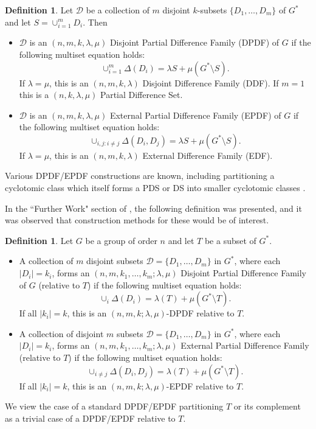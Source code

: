 \documentclass[12pt, a4paper]{article}
\theoremstyle{definition}
\newtheorem{definition}[theorem]{Definition}
\begin{document}
\begin{definition}\label{DPDF}
Let $\mathcal D$ be a collection of $m$ disjoint $k$-subsets $\{ D_1, \ldots, D_m \}$ of $G^*$ and let $S=\cup_{i=1}^m D_i$.  Then
\begin{itemize}
\item[(i)]  $\mathcal D$ is an $(n,m, k, \lambda, \mu)$ Disjoint Partial Difference Family (DPDF) of $G$ if the following multiset equation holds: 
$$ \cup_{i=1}^m \Delta(D_i)= \lambda S + \mu (G^* \setminus S).$$
If $\lambda=\mu$, this is an $(n,m,k,\lambda)$ Disjoint Difference Family (DDF). If $m=1$ this is a $(n,k,\lambda,\mu)$ Partial Difference Set.
\item[(ii)] $\mathcal D$ is an $(n,m, k, \lambda, \mu)$ External Partial Difference Family (EPDF) of $G$ if the following multiset equation holds: 
$$ \cup_{i,j: i \neq j} \Delta(D_i, D_j)= \lambda S + \mu (G^* \setminus S).$$
If $\lambda=\mu$, this is an $(n,m,k,\lambda)$ External Difference Family (EDF).
\end{itemize}
\end{definition}
Various DPDF/EPDF constructions are known, including partitioning a cyclotomic class which itself forms a PDS or DS into smaller cyclotomic classes \cite{HucJoh}.

In the ``Further Work" section of \cite{HucJoh}, the following definition was presented, and it was observed that construction methods for these would be of interest.

\begin{definition}
Let $G$ be a group of order $n$ and let $T$ be a subset of $G^*$. 
\begin{itemize}
\item[(i)] A collection of $m$ disjoint subsets $\mathcal{D} = \{ D_1, \ldots, D_m \}$ in $G^*$, where each $|D_i|=k_i$, forms an $(n,m, k_1, \ldots, k_m; \lambda, \mu)$ Disjoint Partial Difference Family of $G$ (relative to $T$) if the following multiset equation holds: 
$$ \cup_i \Delta(D_i)= \lambda(T) + \mu (G^* \setminus T). $$
If all $|k_i|=k$, this is an $(n,m,k; \lambda, \mu)$-DPDF relative to $T$.
\item[(ii)] A collection of disjoint $m$ subsets $\mathcal{D} = \{ D_1, \ldots, D_m \}$ in $G^*$, where each $|D_i|=k_i$, forms an $(n,m, k_1, \ldots, k_m; \lambda, \mu)$ External Partial Difference Family (relative to $T$) if the following multiset equation holds: 
$$ \cup_{i \neq j} \Delta(D_i, D_j)= \lambda(T) + \mu (G^* \setminus T).$$
If all $|k_i|=k$, this is an $(n,m,k; \lambda, \mu)$-EPDF relative to $T$.
\end{itemize}
\end{definition}
We view the case of a standard DPDF/EPDF partitioning $T$ or its complement as a trivial case of a DPDF/EPDF relative to $T$. 
\end{document}
